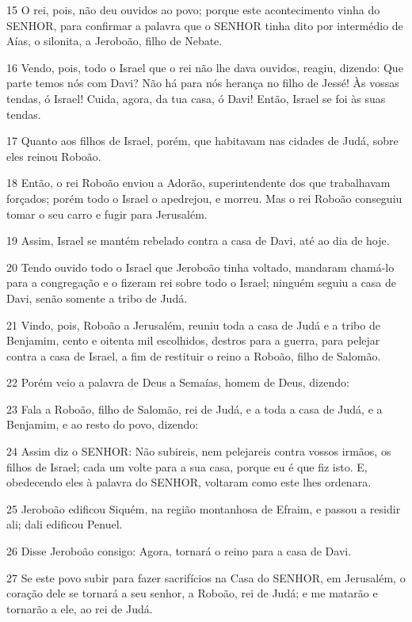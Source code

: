 \par 15 O rei, pois, não deu ouvidos ao povo; porque este acontecimento vinha do SENHOR, para confirmar a palavra que o SENHOR tinha dito por intermédio de Aías, o silonita, a Jeroboão, filho de Nebate.
\par 16 Vendo, pois, todo o Israel que o rei não lhe dava ouvidos, reagiu, dizendo: Que parte temos nós com Davi? Não há para nós herança no filho de Jessé! Às vossas tendas, ó Israel! Cuida, agora, da tua casa, ó Davi! Então, Israel se foi às suas tendas.
\par 17 Quanto aos filhos de Israel, porém, que habitavam nas cidades de Judá, sobre eles reinou Roboão.
\par 18 Então, o rei Roboão enviou a Adorão, superintendente dos que trabalhavam forçados; porém todo o Israel o apedrejou, e morreu. Mas o rei Roboão conseguiu tomar o seu carro e fugir para Jerusalém.
\par 19 Assim, Israel se mantém rebelado contra a casa de Davi, até ao dia de hoje.
\par 20 Tendo ouvido todo o Israel que Jeroboão tinha voltado, mandaram chamá-lo para a congregação e o fizeram rei sobre todo o Israel; ninguém seguiu a casa de Davi, senão somente a tribo de Judá.
\par 21 Vindo, pois, Roboão a Jerusalém, reuniu toda a casa de Judá e a tribo de Benjamim, cento e oitenta mil escolhidos, destros para a guerra, para pelejar contra a casa de Israel, a fim de restituir o reino a Roboão, filho de Salomão.
\par 22 Porém veio a palavra de Deus a Semaías, homem de Deus, dizendo:
\par 23 Fala a Roboão, filho de Salomão, rei de Judá, e a toda a casa de Judá, e a Benjamim, e ao resto do povo, dizendo:
\par 24 Assim diz o SENHOR: Não subireis, nem pelejareis contra vossos irmãos, os filhos de Israel; cada um volte para a sua casa, porque eu é que fiz isto. E, obedecendo eles à palavra do SENHOR, voltaram como este lhes ordenara.
\par 25 Jeroboão edificou Siquém, na região montanhosa de Efraim, e passou a residir ali; dali edificou Penuel.
\par 26 Disse Jeroboão consigo: Agora, tornará o reino para a casa de Davi.
\par 27 Se este povo subir para fazer sacrifícios na Casa do SENHOR, em Jerusalém, o coração dele se tornará a seu senhor, a Roboão, rei de Judá; e me matarão e tornarão a ele, ao rei de Judá.
